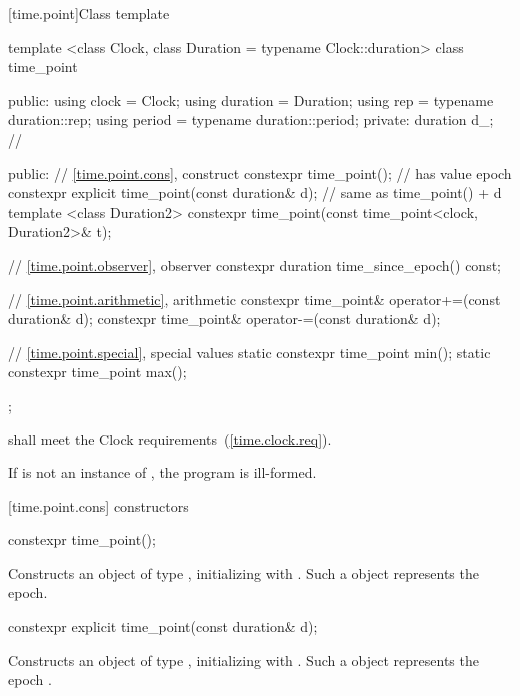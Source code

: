 [time.point]{Class template }

%
\begin{codeblock}
template <class Clock, class Duration = typename Clock::duration>
class time_point {
public:
  using clock    = Clock;
  using duration = Duration;
  using rep      = typename duration::rep;
  using period   = typename duration::period;
private:
  duration d_;  // \expos

public:
  // \ref{time.point.cons}, construct
  constexpr time_point();  // has value epoch
  constexpr explicit time_point(const duration& d);  // same as time_point() + d
  template <class Duration2>
    constexpr time_point(const time_point<clock, Duration2>& t);

  // \ref{time.point.observer}, observer
  constexpr duration time_since_epoch() const;

  // \ref{time.point.arithmetic}, arithmetic
  constexpr time_point& operator+=(const duration& d);
  constexpr time_point& operator-=(const duration& d);

  // \ref{time.point.special}, special values
  static constexpr time_point min();
  static constexpr time_point max();
};
\end{codeblock}

\pnum
{} shall meet the Clock requirements~(\ref{time.clock.req}).

\pnum
If  is not an instance of ,
the program is ill-formed.

[time.point.cons]{ constructors}

%
\begin{itemdecl}
constexpr time_point();
\end{itemdecl}

\begin{itemdescr}
\pnum
\effects Constructs an object of type , initializing
 with . Such a  object
represents the epoch.
\end{itemdescr}

%
\begin{itemdecl}
constexpr explicit time_point(const duration& d);
\end{itemdecl}

\begin{itemdescr}
\pnum
\effects Constructs an object of type , initializing
 with . Such a  object represents the epoch
.
\end{itemdescr}

